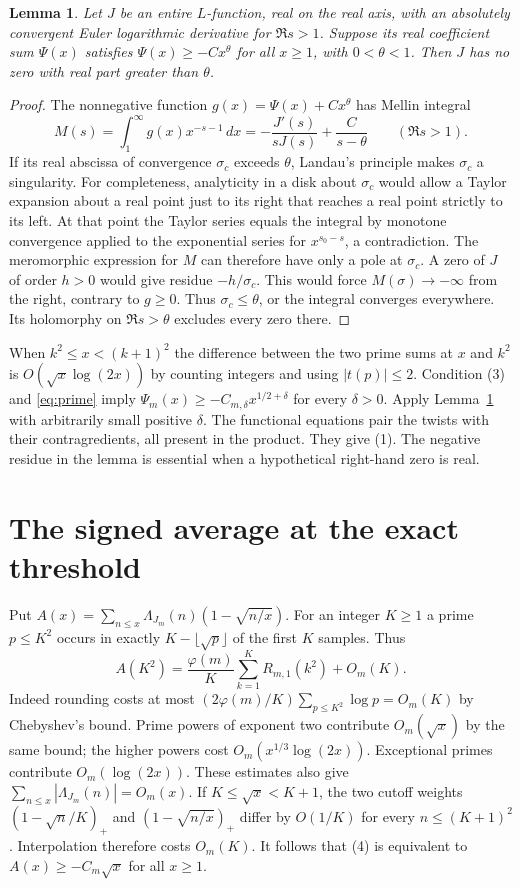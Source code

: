 \documentclass[11pt]{article}
\newtheorem{lemma}[theorem]{Lemma}
\begin{document}
\begin{lemma}\label{lem:landau}
Let $J$ be an entire $L$-function, real on the real axis, with an absolutely convergent Euler logarithmic derivative for $\Re s>1$. Suppose its real coefficient sum $\Psi(x)$ satisfies $\Psi(x)\ge-C x^\theta$ for all $x\ge1$, with $0<\theta<1$. Then $J$ has no zero with real part greater than $\theta$.
\end{lemma}
\begin{proof}
The nonnegative function $g(x)=\Psi(x)+C x^\theta$ has Mellin integral
\[
 M(s)=\int_1^\infty g(x)x^{-s-1}\,dx
     =-\frac{J'(s)}{sJ(s)}+\frac C{s-\theta}\qquad(\Re s>1).
\]
If its real abscissa of convergence $\sigma_c$ exceeds $\theta$, Landau's principle makes $\sigma_c$ a singularity. For completeness, analyticity in a disk about $\sigma_c$ would allow a Taylor expansion about a real point just to its right that reaches a real point strictly to its left. At that point the Taylor series equals the integral by monotone convergence applied to the exponential series for $x^{s_0-s}$, a contradiction. The meromorphic expression for $M$ can therefore have only a pole at $\sigma_c$. A zero of $J$ of order $h>0$ would give residue $-h/\sigma_c$. This would force $M(\sigma)\to-\infty$ from the right, contrary to $g\ge0$. Thus $\sigma_c\le\theta$, or the integral converges everywhere. Its holomorphy on $\Re s>\theta$ excludes every zero there.
\end{proof}
When $k^2\le x<(k+1)^2$ the difference between the two prime sums at $x$ and $k^2$ is $O(\sqrt{x}\log(2x))$ by counting integers and using $|t(p)|\le2$. Condition (3) and \eqref{eq:prime} imply $\Psi_m(x)\ge-C_{m,\delta}x^{1/2+\delta}$ for every $\delta>0$. Apply Lemma~\ref{lem:landau} with arbitrarily small positive $\delta$. The functional equations pair the twists with their contragredients, all present in the product. They give (1). The negative residue in the lemma is essential when a hypothetical right-hand zero is real.

\section{The signed average at the exact threshold}
Put $A(x)=\sum_{n\le x}\Lambda_{J_m}(n)(1-\sqrt{n/x})$. For an integer $K\ge1$ a prime $p\le K^2$ occurs in exactly $K-\lfloor\sqrt p\rfloor$ of the first $K$ samples. Thus
\begin{equation}\label{eq:smooth}
 A(K^2)=\frac{\varphi(m)}{K}\sum_{k=1}^K R_{m,1}(k^2)+O_m(K).
\end{equation}
Indeed rounding costs at most $(2\varphi(m)/K)\sum_{p\le K^2}\log p=O_m(K)$ by Chebyshev's bound. Prime powers of exponent two contribute $O_m(\sqrt x)$ by the same bound; the higher powers cost $O_m(x^{1/3}\log(2x))$. Exceptional primes contribute $O_m(\log(2x))$. These estimates also give $\sum_{n\le x}|\Lambda_{J_m}(n)|=O_m(x)$. If $K\le\sqrt x<K+1$, the two cutoff weights $(1-\sqrt n/K)_+$ and $(1-\sqrt{n/x})_+$ differ by $O(1/K)$ for every $n\le(K+1)^2$. Interpolation therefore costs $O_m(K)$. It follows that (4) is equivalent to $A(x)\ge-C_m\sqrt x$ for all $x\ge1$.
\end{document}
